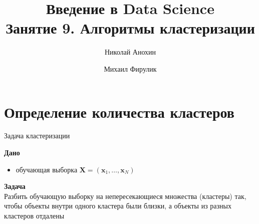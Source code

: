 \documentclass[10pt,a4paper]{beamer}
\author{Николай Анохин \and Михаил Фирулик}
\title{Введение в Data Science \\ Занятие 9. Алгоритмы кластеризации}
\begin{document}
\maketitle


\begin{frame}

\tableofcontents

\end{frame}


\section{Определение количества кластеров}


\begin{frame}{Задача кластеризации}

{\bf Дано} 
\begin{itemize}
\item обучающая выборка $\mathbf{X} = (\mathbf{x}_1, \ldots, \mathbf{x}_N)$
\end{itemize}

\vspace{1em}
{\bf Задача} \\
Разбить обучающую выборку на непересекающиеся множества (кластеры) так, чтобы объекты внутри одного кластера были близки, а объекты из разных кластеров отдалены

\end{frame}

\end{document}
